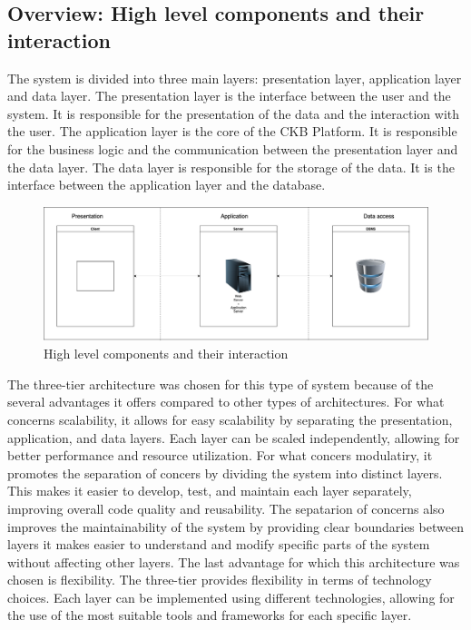 \subsection{Overview: High level components and their interaction}
The system is divided into three main layers: presentation layer, application layer and data layer. The presentation layer is the interface between the user and the system. It is responsible for the presentation of the data and the interaction with the user. The application layer is the core of the CKB Platform. It is responsible for the business logic and the communication between the presentation layer and the data layer. The data layer is responsible for the storage of the data. It is the interface between the application layer and the database.
\begin{figure}[H]
    \centering
    \includegraphics[width=\textwidth]{Images/three_tier.png}
    \caption{High level components and their interaction}
\end{figure}

The three-tier architecture was chosen for this type of system because of the several advantages it offers compared to other types of architectures. For what concerns scalability, it allows for easy scalability by separating the presentation, application, and data layers. Each layer can be scaled independently, allowing for better performance and resource utilization.
For what concers modulatiry, it promotes the separation of concers by dividing the system into distinct layers. This makes it easier to develop, test, and maintain each layer separately, improving overall code quality and reusability. The sepatarion of concerns also improves the maintainability of the system by providing clear boundaries between layers it makes easier to understand and modify specific parts of the system without affecting other layers.
The last advantage for which this architecture was chosen is flexibility. The three-tier provides flexibility in terms of technology choices. Each layer can be implemented using different technologies, allowing for the use of the most suitable tools and frameworks for each specific layer.

